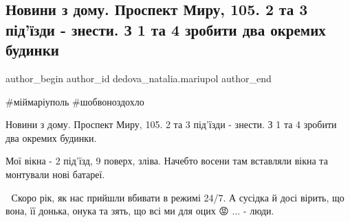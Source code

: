  
 
 
 
 

\subsection{Новини з дому. Проспект Миру, 105. 2 та 3 під'їзди - знести. З 1 та 4 зробити два окремих будинки}
\label{sec:24_01_2023.fb.dedova_natalia.mariupol.1.novini_z_domu__prosp}

\ifcmt
 author_begin
   author_id dedova_natalia.mariupol
 author_end
\fi

\#міймаріуполь 
\#шобвоноздохло

Новини з дому. Проспект Миру, 105. 2 та 3 під'їзди - знести. З 1 та 4 зробити
два окремих будинки. 

Мої вікна - 2 під'їзд, 9 поверх, зліва. Начебто восени там вставляли вікна та
монтували нові батареї. 

🤔 Скоро рік, як нас прийшли вбивати в режимі 24/7. А сусідка й досі вірить, що
вона, її донька, онука та зять, що всі ми для оцих 😡 ... - люди.
